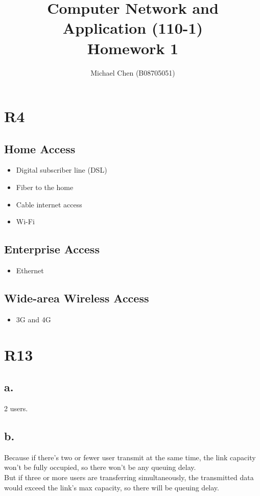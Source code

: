 \documentclass[11pt,a4paper]{article}
\title{Computer Network and Application (110-1) \\ Homework 1}
\author{Michael Chen (B08705051)}
\date{}
\begin{document}
\maketitle

\section{R4}

\subsection{Home Access}
\begin{itemize}
    \item Digital subscriber line (DSL)
    \item Fiber to the home 
    \item Cable internet access
    \item Wi-Fi
\end{itemize}

\subsection{Enterprise Access}
\begin{itemize}
    \item Ethernet
\end{itemize}

\subsection{Wide-area Wireless Access}
\begin{itemize}
    \item 3G and 4G
\end{itemize}

\section{R13}

\subsection{a.}
2 users.

\subsection{b.}
Because if there's two or fewer user transmit at the same time, the link capacity won't be fully occupied, so there won't be any queuing delay. \\
But if three or more users are transferring simultaneously, the transmitted data would exceed the link's max capacity, so there will be queuing delay.
\end{document}

